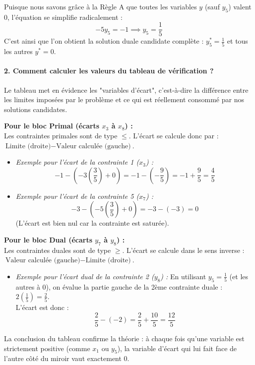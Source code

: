 \documentclass[12pt,a4paper]{article}
\begin{document}
Puisque nous savons grâce à la Règle A que toutes les variables $y$ (sauf $y_5$) valent $0$, l'équation se simplifie radicalement :
$$ -5y_5 = -1 \implies y_5 = \frac{1}{5} $$
C'est ainsi que l'on obtient la solution duale candidate complète : $y_5^* = \frac{1}{5}$ et tous les autres $y^* = 0$.

\paragraph{2. Comment calculer les valeurs du tableau de vérification ?}
Le tableau met en évidence les "variables d'écart", c'est-à-dire la différence entre les limites imposées par le problème et ce qui est réellement consommé par nos solutions candidates.

\vspace{0.3cm}
\noindent\textbf{Pour le bloc Primal (écarts $x_3$ à $x_8$) :} \\
Les contraintes primales sont de type $\leq$. L'écart se calcule donc par : $\text{Limite (droite)} - \text{Valeur calculée (gauche)}$.
\begin{itemize}
    \item \textit{Exemple pour l'écart de la contrainte 1 ($x_3$) :}
    $$ -1 - \left( -3\left(\frac{3}{5}\right) + 0 \right) = -1 - \left(-\frac{9}{5}\right) = -1 + \frac{9}{5} = \frac{4}{5} $$
    \item \textit{Exemple pour l'écart de la contrainte 5 ($x_7$) :}
    $$ -3 - \left( -5\left(\frac{3}{5}\right) + 0 \right) = -3 - (-3) = 0 $$
    (L'écart est bien nul car la contrainte est saturée).
\end{itemize}

\vspace{0.3cm}
\noindent\textbf{Pour le bloc Dual (écarts $y_7$ à $y_8$) :} \\
Les contraintes duales sont de type $\geq$. L'écart se calcule dans le sens inverse : $\text{Valeur calculée (gauche)} - \text{Limite (droite)}$.
\begin{itemize}
    \item \textit{Exemple pour l'écart dual de la contrainte 2 ($y_8$) :} En utilisant $y_5 = \frac{1}{5}$ (et les autres à $0$), on évalue la partie gauche de la 2ème contrainte duale : $2\left(\frac{1}{5}\right) = \frac{2}{5}$. \\
    L'écart est donc :
    $$ \frac{2}{5} - (-2) = \frac{2}{5} + \frac{10}{5} = \frac{12}{5} $$
\end{itemize}

\vspace{0.3cm}
\noindent La conclusion du tableau confirme la théorie : à chaque fois qu'une variable est strictement positive (comme $x_1$ ou $y_5$), la variable d'écart qui lui fait face de l'autre côté du miroir vaut exactement $0$.
\newpage
\end{document}
